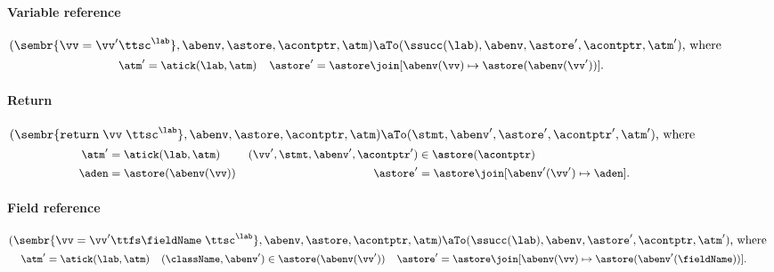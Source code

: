 \begin{figure}
\paragraph{Variable reference}
\begin{gather*}
  (
  \sembr{\vv = \vv' \ttsc^\lab},
  \abenv,
  \astore,
  \acontptr,
  \atm
  )
  \aTo
  (
  \ssucc(\lab),
  \abenv,
  \astore',
  \acontptr,
  \atm'
  )\text{, where }\\
\begin{small}\begin{align*}
  \atm' & = \atick(\lab, \atm)
  &
  \astore' &= \astore \join [\abenv(\vv) \mapsto \astore(\abenv(\vv'))]
  \text.
\end{align*}\end{small}\end{gather*}

\paragraph{Return}
\begin{gather*}
  (\sembr{\texttt{return}\; \vv\; \ttsc^\lab}, \abenv, \astore, \acontptr, \atm)
  \aTo
  (\stmt, \abenv', \astore', \acontptr', \atm')\text{, where }
  \\
\begin{small}\begin{align*}
  \atm' &= \atick(\lab, \atm)
  &
  (\vv',\stmt, \abenv', \acontptr') &\in \astore(\acontptr)
  \\
  \aden &= \astore(\abenv(\vv))
  &
  \astore' &= \astore \join [\abenv'(\vv') \mapsto \aden]
  \text.
\end{align*}\end{small}\end{gather*}



\paragraph{Field reference}
\begin{gather*}
  (
  \sembr{\vv = \vv'\ttfs \fieldName\; \ttsc^\lab},
  \abenv,
  \astore,
  \acontptr,
  \atm
  )
  \aTo
  (
  \ssucc(\lab),
  \abenv,
  \astore',
  \acontptr,
  \atm'
  )\text{, where }
  \\
\begin{small}\begin{align*}
  \atm' & = \atick(\lab, \atm)
  &
  (\className,\abenv') &\in \astore(\abenv(\vv'))
  &
  \astore' &= \astore \join [\abenv(\vv) \mapsto \astore(\abenv'(\fieldName))]
  \text.
\end{align*}\end{small}\end{gather*}





\end{figure}
